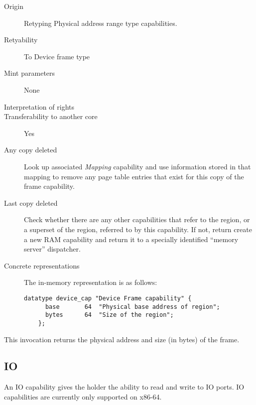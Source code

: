 \begin{description}
\item[Origin] Retyping Physical address range type capabilities.
  
\item[Retyability] To Device frame type
  
\item[Mint parameters] None
  
\item[Interpretation of rights] 
  
\item[Transferability to another core] Yes

\item[Any copy deleted] Look up associated \emph{Mapping} capability and use
  information stored in that mapping to remove any page table entries that
  exist for this copy of the frame capability.

\item[Last copy deleted] Check whether there are any other capabilities that
  refer to the region, or a superset of the region, referred to by this
    capability. If not, return create a new RAM capability and return it to a
    specially identified ``memory server'' dispatcher.
  
\item[Concrete representations] The in-memory representation is as follows:
  
  \begin{lstlisting}[language=Mackerel]
    datatype device_cap "Device Frame capability" {
      base       64  "Physical base address of region";
      bytes      64  "Size of the region";
    };
  \end{lstlisting}
\end{description}  

 This invocation returns the physical
address and size (in bytes) of the frame.

\subsection{IO}
An IO capability gives the holder the ability to read and write to IO ports.
IO capabilities are currently only supported on x86-64.

